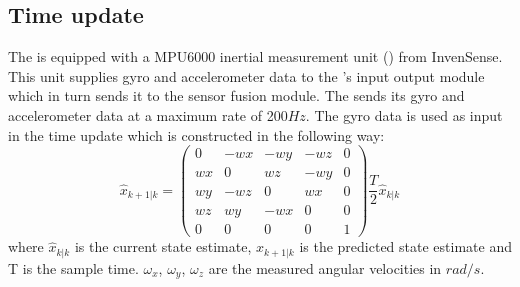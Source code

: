 



\subsection{Time update}
The \abbrROV is equipped with a MPU6000 inertial measurement unit (\abbrIMU) from InvenSense.
This unit supplies gyro and accelerometer data to the \abbrROV's input output module which in turn sends it to the sensor fusion module. The \abbrIMU sends its gyro and accelerometer data at a maximum rate of 200$Hz$.
The gyro data is used as input in the \abbrEKF time update which is constructed in the following way:
\begin{equation}
   \hat{x}_{k+1|k} = 
   \begin{pmatrix}
    0 & -wx & -wy & -wz & 0\\
    wx & 0 &  wz & -wy & 0\\
    wy & -wz & 0 &  wx & 0\\
    wz &  wy & -wx & 0 & 0\\
    0 & 0 & 0 & 0 & 1
   \end{pmatrix}
    \frac{T}{2}\hat{x}_{k|k}
\end{equation}
where $\hat{x}_{k|k}$ is the current state estimate, $\hat{x}_{k+1|k}$ is the predicted state estimate and T is the sample time.
$\omega_x$, $\omega_y$, $\omega_z$ are the measured angular velocities in $rad/s$.
